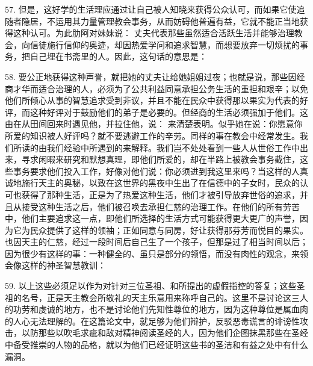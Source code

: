 57. 但是，这好学的生活理应通过让自己被人知晓来获得公众认可，而如果它使追随者隐居，不运用其力量管理教会事务，从而妨碍他普遍有益，它就不能正当地获得这种认可。为此肋阿对妹妹说： 丈夫代表那些虽然适合活跃生活并能够治理教会，向信徒施行信仰的奥迹，却因热爱学问和追求智慧，而想要放弃一切烦扰的事务，把自己埋在书斋里的人。因此，这句话的意思是：\par

58. 要公正地获得这种声誉，就把她的丈夫让给她姐姐过夜；也就是说，那些因经商才华而适合治理的人，必须为了公共利益同意承担公务生活的重担和艰辛；以免他们所倾心从事的智慧追求受到非议，并且不能在民众中获得那以果实为代表的好评，而这种好评对于鼓励他们的弟子是必要的。但经商的生活必须强加于他们。这由在从田间回来时遇见他，并拉住他，说： 来清楚表明。似乎她在说：你愿意你所爱的知识被人好评吗？就不要逃避工作的辛劳。同样的事在教会中经常发生。我们所读的由我们经验中所遇到的来解释。我们岂不处处看到一些人从世俗工作中出来，寻求闲暇来研究和默想真理，即他们所爱的，却在半路上被教会事务截住，这些事务要求他们投入工作，好像对他们说：你必须进到我这里来吗？当这样的人真诚地施行天主的奥秘，以致在这世界的黑夜中生出了在信德中的子女时，民众的认可也获得了那种生活，正是为了热爱这种生活，他们才被引导放弃世俗的追求，并且从接受这种生活之后，他们被召唤去承担仁慈的治理工作。在他们的所有劳苦中，他们主要追求这一点，即他们所选择的生活方式可能获得更大更广的声誉，因为它为民众提供了这样的领袖；正如同意与同房，好让获得那芬芳而悦目的果实。也因天主的仁慈，经过一段时间后自己生了一个孩子，但那是过了相当时间以后；因为很少有这样的事：一种健全的、虽只是部分的领悟，而没有肉性的观念，来领会像这样的神圣智慧教训：\par

59. 以上这些必须足以作为对针对三位圣祖、和所提出的虚假指控的答复；这些圣祖的名号，正是天主教会所敬礼的天主乐意用来称呼自己的。这里不是讨论这三人的功劳和虔诚的地方，也不是讨论他们先知性尊位的地方，因为这种尊位是属血肉的人心无法理解的。在这篇论文中，就足够为他们辩护，反驳恶毒谎言的诽谤性攻击，以防那些以吹毛求疵和敌对精神阅读圣经的人，因为他们企图抹黑那些在圣经中备受推崇的人物的品格，就以为他们已经证明这些书的圣洁和有益之处中有什么漏洞。\par

